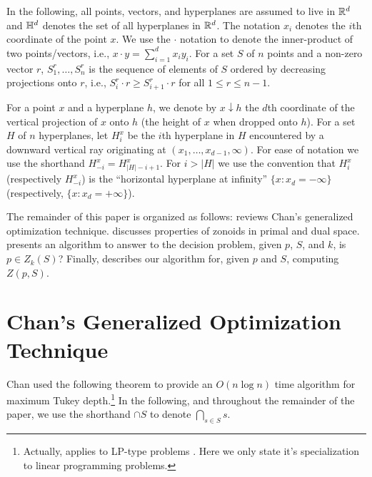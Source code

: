 \documentclass[lotsofwhite]{patmorin}
\newcommand{\drop}{\!\!\downarrow\!\!}
\begin{document}
In the following, all points, vectors, and hyperplanes are assumed to
live in $\mathbb{R}^d$ and $\mathbb{H}^d$ denotes the set of all hyperplanes in
$\mathbb{R}^d$.  The notation $x_i$ denotes the $i$th coordinate of the point
$x$.  We use the $\cdot$ notation to denote the inner-product of two
points/vectors, i.e., $x\cdot y=\sum_{i=1}^d x_iy_i$.  For a set $S$
of $n$ points and a non-zero vector $r$, $S_1^r,\ldots,S_n^r$ is the
sequence of elements of $S$ ordered by decreasing projections onto
$r$, i.e., $S_i^r\cdot r \ge S_{i+1}^r\cdot r$ for all $1\le r\le
n-1$.

For a point $x$ and a hyperplane $h$, we denote by $x\drop h$ the
$d$th coordinate of the vertical projection of $x$ onto $h$ (the
height of $x$ when dropped onto $h$).  For a set $H$ of $n$
hyperplanes, let $H_i^x$ be the $i$th hyperplane in $H$ encountered by
a downward vertical ray originating at $(x_1,\ldots,x_{d-1},\infty)$.
For ease of notation we use the shorthand $H_{-i}^x=H_{|H|-i+1}^x$.
For $i>|H|$ we use the convention that $H_{i}^x$ (respectively
$H_{-i}^x$) is the ``horizontal hyperplane at infinity''
$\{x:x_d=-\infty\}$ (respectively, $\{x:x_d=+\infty\}$). 

The remainder of this paper is organized as follows: 
reviews Chan's generalized optimization technique.  
discusses properties of zonoids in primal and dual space.
 presents an algorithm to answer to the decision
problem, given $p$, $S$, and $k$, is $p\in Z_k(S)$?  Finally,
 describes our algorithm for, given $p$ and $S$,
computing $Z(p,S)$.
 
\section{Chan's Generalized Optimization Technique}

Chan \cite{c04} used the following theorem to provide an $O(n\log n)$
time algorithm for maximum Tukey depth.\footnote{Actually,
 applies to LP-type problems \cite{sw92}. Here we only state it's
specialization to linear programming problems.}  In the following, and
throughout the remainder of the paper, we use the shorthand $\cap S$
to denote $\bigcap_{s\in S}s$.
\end{document}
